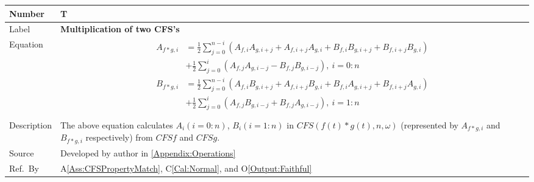 \documentclass[12pt]{article}
\newcommand{\colAwidth}{0.13\textwidth}
\newcommand{\colBwidth}{0.82\textwidth}
\newcounter{theorynum} %
\newcommand{\aref}[1]{A\ref{#1}}
\newcommand{\calref}[1]{C\ref{#1}}
\newcommand{\oref}[1]{O\ref{#1}}
\begin{document}
\noindent
\begin{minipage}{\textwidth}
	\renewcommand*{\arraystretch}{1.5}
	\begin{tabular}{| p{\colAwidth} | p{\colBwidth}|}
		\hline
		\rowcolor[gray]{0.9}
		Number& T{theorynum}\thetheorynum \label{T:Multiplication}\\
		\hline
		Label&\bf Multiplication of two CFS's\\
		\hline
		Equation&  
		\begin{equation}
		\begin{aligned}
		A_{f*g, i}
		&=\frac{1}{2}\sum_{j=0}^{n-i}(A_{f,i}A_{g,i+j}+A_{f, i+j}A_{g, i}+B_{f,i}B_{g,i+j}+B_{f,i+j}B_{g,i})\\&+\frac{1}{2}\sum_{j=0}^{i}(A_{f,j}A_{g,i-j}-B_{f,j}B_{g,i-j}),~i=0:n\\
		B_{f*g, i}
		&=\frac{1}{2}\sum_{j=0}^{n-i}(A_{f,i}B_{g,i+j}+A_{f, i+j}B_{g, i}+B_{f,i}A_{g,i+j}+B_{f,i+j}A_{g,i})\\&+\frac{1}{2}\sum_{j=0}^{i}(A_{f,j}B_{g,i-j}+B_{f,j}A_{g,i-j}),~i=1:n\\
		\end{aligned}
		\end{equation}\\
		\hline
		Description & The above equation calculates $A_i(i=0:n)$, $B_i(i=1:n)$ in $\mathit{CFS}(f(t)*g(t), n, \omega)$  (represented by $A_{f*g, i}$ and $B_{f*g, i}$ respectively) from $\mathit{CFSf}$ and $\mathit{CFSg}$.\\
		
		\hline
		Source & Developed by author in \autoref{Appendix:Operations}\\
		\hline
		Ref.\ By & \aref{Ass:CFSPropertyMatch}, \calref{Cal:Normal}, and \oref{Output:Faithful}\\
		\hline
	\end{tabular}
\end{minipage}\\
\end{document}
